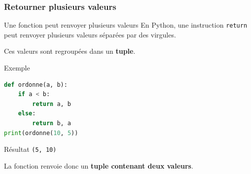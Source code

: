 \documentclass[10pt]{beamer}
\begin{document}
\begin{frame}[containsverbatim]
	\frametitle{Retourner plusieurs valeurs}
	\begin{block}{Une fonction peut renvoyer plusieurs valeurs}
		En Python, une instruction \texttt{return} peut renvoyer
		plusieurs valeurs séparées par des virgules.
		
		\vspace{0.05cm}
		
		Ces valeurs sont regroupées dans un \textbf{tuple}.
	\end{block}
	
	\vspace{0.15cm}
	
	\begin{exampleblock}{Exemple}
		\begin{lstlisting}[language=Python]
def ordonne(a, b):
	if a < b:
		return a, b
	else:
		return b, a
print(ordonne(10, 5))
		\end{lstlisting}
	\end{exampleblock}
	

	\vspace{0.1cm}
	
	\begin{alertblock}{Résultat}
		\centering
		\texttt{(5, 10)}
		
		\vspace{0.05cm}
		
		La fonction renvoie donc un \textbf{tuple contenant deux valeurs}.
	\end{alertblock}
	
	
\end{frame}
\end{document}

